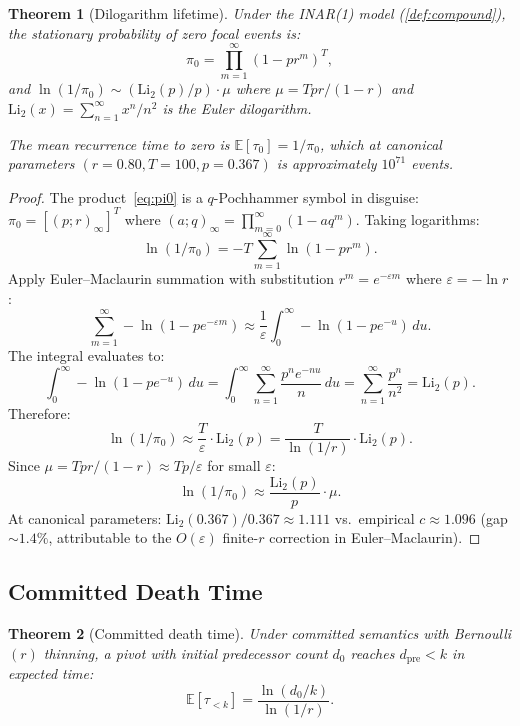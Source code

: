 \documentclass[11pt]{article}
\theoremstyle{plain}
\newtheorem{theorem}{Theorem}[section]
\theoremstyle{definition}
\theoremstyle{remark}
\newcommand{\dpre}[1][]{d_{\mathrm{pre}#1}}
\begin{document}
\begin{theorem}[Dilogarithm lifetime]\label{thm:dilogarithm}
Under the INAR(1) model (\cref{def:compound}), the stationary
probability of zero focal events is:
\begin{equation}\label{eq:pi0}
  \pi_0 = \prod_{m=1}^{\infty} (1 - pr^m)^T,
\end{equation}
and $\ln(1/\pi_0) \sim (\mathrm{Li}_2(p)/p) \cdot \mu$ where
$\mu = Tpr/(1-r)$ and $\mathrm{Li}_2(x) = \sum_{n=1}^{\infty}
x^n/n^2$ is the Euler dilogarithm.

The mean recurrence time to zero is $\mathbb{E}[\tau_0] = 1/\pi_0$,
which at canonical parameters $(r = 0.80, T = 100, p = 0.367)$ is
approximately $10^{71}$ events.
\end{theorem}

\begin{proof}
The product~\eqref{eq:pi0} is a $q$-Pochhammer symbol in disguise:
$\pi_0 = [(p; r)_\infty]^T$ where $(a; q)_\infty = \prod_{m=0}^\infty
(1 - aq^m)$.  Taking logarithms:
\[
  \ln(1/\pi_0) = -T \sum_{m=1}^{\infty} \ln(1 - pr^m).
\]
Apply Euler--Maclaurin summation with substitution $r^m = e^{-\varepsilon m}$
where $\varepsilon = -\ln r$:
\[
  \sum_{m=1}^{\infty} -\ln(1 - pe^{-\varepsilon m})
  \approx \frac{1}{\varepsilon} \int_0^{\infty} -\ln(1 - pe^{-u})\, du.
\]
The integral evaluates to:
\[
  \int_0^{\infty} -\ln(1 - pe^{-u})\, du
  = \int_0^{\infty} \sum_{n=1}^{\infty} \frac{p^n e^{-nu}}{n}\, du
  = \sum_{n=1}^{\infty} \frac{p^n}{n^2}
  = \mathrm{Li}_2(p).
\]
Therefore:
\[
  \ln(1/\pi_0) \approx \frac{T}{\varepsilon} \cdot \mathrm{Li}_2(p)
  = \frac{T}{\ln(1/r)} \cdot \mathrm{Li}_2(p).
\]
Since $\mu = Tpr/(1-r) \approx Tp/\varepsilon$ for small $\varepsilon$:
\[
  \ln(1/\pi_0) \approx \frac{\mathrm{Li}_2(p)}{p} \cdot \mu.
\]
At canonical parameters: $\mathrm{Li}_2(0.367)/0.367 \approx 1.111$
vs.\ empirical $c \approx 1.096$ (gap ${\sim}1.4\%$, attributable to
the $O(\varepsilon)$ finite-$r$ correction in Euler--Maclaurin).
\end{proof}

\subsection{Committed Death Time}

\begin{theorem}[Committed death time]\label{thm:committed-death}
Under committed semantics with Bernoulli$(r)$ thinning, a pivot with
initial predecessor count $d_0$ reaches $\dpre < k$ in expected time:
\begin{equation}\label{eq:death-time}
  \mathbb{E}[\tau_{<k}] = \frac{\ln(d_0/k)}{\ln(1/r)}.
\end{equation}
\end{theorem}
\end{document}
